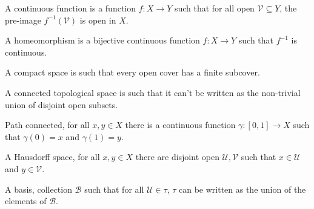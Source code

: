 \documentclass{article}                                                        %
\begin{document}
        \begin{definition}
            A continuous function is a function $f:X\rightarrow{Y}$ such that
            for all open $\mathcal{V}\subseteq{Y}$, the pre-image
            $f^{\minus{1}}(\mathcal{V})$ is open in $X$.
        \end{definition}
        \begin{definition}
            A homeomorphism is a bijective continuous function
            $f:X\rightarrow{Y}$ such that $f^{\minus{1}}$ is continuous.
        \end{definition}
        \begin{definition}
            A compact space is such that every open cover has a finite subcover.
        \end{definition}
        \begin{definition}
            A connected topological space is such that it can't be written as
            the non-trivial union of disjoint open subsets.
        \end{definition}
        \begin{definition}
            Path connected, for all $x,y\in{X}$ there is a continuous function
            $\gamma:[0,1]\rightarrow{X}$ such that $\gamma(0)=x$ and
            $\gamma(1)=y$.
        \end{definition}
        \begin{definition}
            A Hausdorff space, for all $x,y\in{X}$ there are disjoint open
            $\mathcal{U},\mathcal{V}$ such that $x\in\mathcal{U}$ and
            $y\in\mathcal{V}$.
        \end{definition}
        \begin{definition}
            A basis, collection $\mathscr{B}$ such that for all
            $\mathcal{U}\in\tau$, $\tau$ can be written as the union of the
            elements of $\mathscr{B}$.
        \end{definition}
\end{document}
